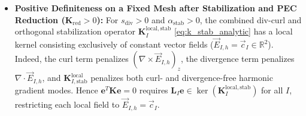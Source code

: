 \documentclass[VANCOUVER]{USG}
\begin{document}
\begin{itemize}
          On configurations with full coverage ($\Omega_{\mathrm{cov}} = \Omega$, such as regular grids where $\bar{M} \approx \pi\alpha_s^2 \approx 2.01$), Eq.~\eqref{eq:norm_equivalence_multiplicity} establishes global norm equivalence on $\boldsymbol{L}^2(\Omega)$; on perturbed clouds with partial coverage ($\Omega_{\mathrm{cov}} \subset \Omega$), it holds over the covered region $\Omega_{\mathrm{cov}}$.
    \item \textbf{Positive Definiteness on a Fixed Mesh after Stabilization and PEC Reduction ($\mathbf{K}_{\mathrm{red}} > 0$):}
          For $s_{\mathrm{div}} > 0$ and $\alpha_{\mathrm{stab}} > 0$, the combined div-curl and orthogonal stabilization operator $\mathbf{K}_I^{\mathrm{local, stab}}$ \eqref{eq:k_stab_analytic} has a local kernel consisting exclusively of constant vector fields ($\vec{E}_{I, h} = \vec{c}_I \in \mathbb{R}^2$). Indeed, the curl term penalizes $(\nabla\times\vec{E}_{I,h})_z$, the divergence term penalizes $\nabla\cdot\vec{E}_{I,h}$, and $\mathbf{K}_{I, \mathrm{stab}}^{\mathrm{local}}$ penalizes both curl- and divergence-free harmonic gradient modes. Hence $\mathbf{e}^T \mathbf{K} \mathbf{e} = 0$ requires $\mathbf{L}_I \mathbf{e} \in \ker(\mathbf{K}_I^{\mathrm{local, stab}})$ for all $I$, restricting each local field to $\vec{E}_{I, h} = \vec{c}_I$.


\end{itemize}
\end{document}
